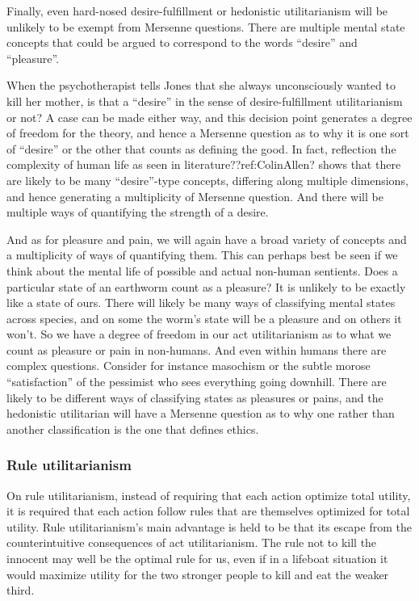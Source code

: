 Finally, even hard-nosed desire-fulfillment or hedonistic utilitarianism will be unlikely to be exempt from Mersenne
questions. There are multiple mental state concepts that could be argued to correspond to the words ``desire'' and 
``pleasure''. 

When the psychotherapist tells Jones that she always unconsciously wanted to kill her mother, is that a ``desire''
in the sense of desire-fulfillment utilitarianism or not? A case can be made either way, and this decision point generates
a degree of freedom for the theory, and hence a Mersenne question as to why it is one sort of ``desire'' or the other that counts
as defining the good. In fact, reflection the complexity of human life as seen in literature??ref:ColinAllen? shows that there are likely
to be many ``desire''-type concepts, differing along multiple dimensions, and hence generating a multiplicity of Mersenne question.
And there will be multiple ways of quantifying the strength of a desire.

And as for pleasure and pain, we will again have a broad variety of concepts and a multiplicity of ways of quantifying them.
This can perhaps best be seen if we think about the mental life of possible and actual non-human sentients. Does a particular
state of an earthworm count as a pleasure? It is unlikely to be exactly like a state of ours. There will likely be many ways
of classifying mental states across species, and on some the worm's state will be a pleasure and on others it won't. So we have
a degree of freedom in our act utilitarianism as to what we count as pleasure or pain in non-humans. And even within humans 
there are complex questions. Consider for instance masochism or the subtle morose ``satisfaction'' of the pessimist who sees 
everything going downhill. There are likely to be different ways of classifying states as pleasures or pains, and the hedonistic
utilitarian will have a Mersenne question as to why one rather than another classification is the one that defines ethics.

\subsubsection{Rule utilitarianism}
On rule utilitarianism, instead of requiring that each action optimize total utility, it is required that each action
follow rules that are themselves optimized for total utility. Rule utilitarianism's main advantage is held to be that
its escape from the counterintuitive consequences of act utilitarianism. The rule not to kill the innocent may well be the
optimal rule for us, even if in a lifeboat situation it would maximize utility for the two stronger people to kill
and eat the weaker third.

